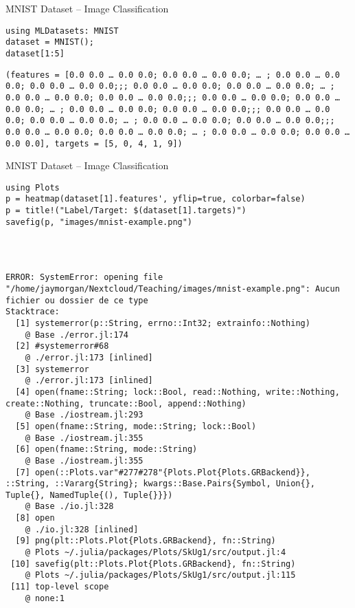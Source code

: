 \documentclass[10pt]{beamer}
\begin{document}
\begin{frame}[label={sec:orge8df729},fragile]{MNIST Dataset -- Image Classification}
 \begin{verbatim}
using MLDatasets: MNIST
dataset = MNIST();
dataset[1:5]
\end{verbatim}

\begin{verbatim}
(features = [0.0 0.0 … 0.0 0.0; 0.0 0.0 … 0.0 0.0; … ; 0.0 0.0 … 0.0 0.0; 0.0 0.0 … 0.0 0.0;;; 0.0 0.0 … 0.0 0.0; 0.0 0.0 … 0.0 0.0; … ; 0.0 0.0 … 0.0 0.0; 0.0 0.0 … 0.0 0.0;;; 0.0 0.0 … 0.0 0.0; 0.0 0.0 … 0.0 0.0; … ; 0.0 0.0 … 0.0 0.0; 0.0 0.0 … 0.0 0.0;;; 0.0 0.0 … 0.0 0.0; 0.0 0.0 … 0.0 0.0; … ; 0.0 0.0 … 0.0 0.0; 0.0 0.0 … 0.0 0.0;;; 0.0 0.0 … 0.0 0.0; 0.0 0.0 … 0.0 0.0; … ; 0.0 0.0 … 0.0 0.0; 0.0 0.0 … 0.0 0.0], targets = [5, 0, 4, 1, 9])
\end{verbatim}
\end{frame}

\begin{frame}[label={sec:org900b752},fragile]{MNIST Dataset -- Image Classification}
 \begin{verbatim}
using Plots
p = heatmap(dataset[1].features', yflip=true, colorbar=false)
p = title!("Label/Target: $(dataset[1].targets)")
savefig(p, "images/mnist-example.png")
\end{verbatim}

\begin{verbatim}



ERROR: SystemError: opening file "/home/jaymorgan/Nextcloud/Teaching/images/mnist-example.png": Aucun fichier ou dossier de ce type
Stacktrace:
  [1] systemerror(p::String, errno::Int32; extrainfo::Nothing)
    @ Base ./error.jl:174
  [2] #systemerror#68
    @ ./error.jl:173 [inlined]
  [3] systemerror
    @ ./error.jl:173 [inlined]
  [4] open(fname::String; lock::Bool, read::Nothing, write::Nothing, create::Nothing, truncate::Bool, append::Nothing)
    @ Base ./iostream.jl:293
  [5] open(fname::String, mode::String; lock::Bool)
    @ Base ./iostream.jl:355
  [6] open(fname::String, mode::String)
    @ Base ./iostream.jl:355
  [7] open(::Plots.var"#277#278"{Plots.Plot{Plots.GRBackend}}, ::String, ::Vararg{String}; kwargs::Base.Pairs{Symbol, Union{}, Tuple{}, NamedTuple{(), Tuple{}}})
    @ Base ./io.jl:328
  [8] open
    @ ./io.jl:328 [inlined]
  [9] png(plt::Plots.Plot{Plots.GRBackend}, fn::String)
    @ Plots ~/.julia/packages/Plots/SkUg1/src/output.jl:4
 [10] savefig(plt::Plots.Plot{Plots.GRBackend}, fn::String)
    @ Plots ~/.julia/packages/Plots/SkUg1/src/output.jl:115
 [11] top-level scope
    @ none:1
\end{verbatim}
\end{frame}
\end{document}
